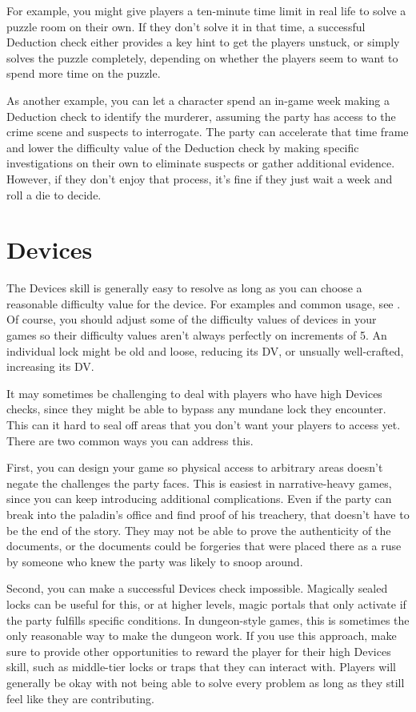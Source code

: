   For example, you might give players a ten-minute time limit in real life to solve a puzzle room on their own.
  If they don't solve it in that time, a successful Deduction check either provides a key hint to get the players unstuck, or simply solves the puzzle completely, depending on whether the players seem to want to spend more time on the puzzle.

  As another example, you can let a character spend an in-game week making a Deduction check to identify the murderer, assuming the party has access to the crime scene and suspects to interrogate.
  The party can accelerate that time frame and lower the difficulty value of the Deduction check by making specific investigations on their own to eliminate suspects or gather additional evidence.
  However, if they don't enjoy that process, it's fine if they just wait a week and roll a die to decide.

\section{Devices}

  The Devices skill is generally easy to resolve as long as you can choose a reasonable difficulty value for the device.
  For examples and common usage, see .
  Of course, you should adjust some of the difficulty values of devices in your games so their difficulty values aren't always perfectly on increments of 5.
  An individual lock might be old and loose, reducing its DV, or unsually well-crafted, increasing its DV.

  It may sometimes be challenging to deal with players who have high Devices checks, since they might be able to bypass any mundane lock they encounter.
  This can it hard to seal off areas that you don't want your players to access yet.
  There are two common ways you can address this.

  First, you can design your game so physical access to arbitrary areas doesn't negate the challenges the party faces.
  This is easiest in narrative-heavy games, since you can keep introducing additional complications.
  Even if the party can break into the paladin's office and find proof of his treachery, that doesn't have to be the end of the story.
  They may not be able to prove the authenticity of the documents, or the documents could be forgeries that were placed there as a ruse by someone who knew the party was likely to snoop around.

  Second, you can make a successful Devices check impossible.
  Magically sealed locks can be useful for this, or at higher levels, magic portals that only activate if the party fulfills specific conditions.
  In dungeon-style games, this is sometimes the only reasonable way to make the dungeon work.
  If you use this approach, make sure to provide other opportunities to reward the player for their high Devices skill, such as middle-tier locks or traps that they can interact with.
  Players will generally be okay with not being able to solve every problem as long as they still feel like they are contributing.

